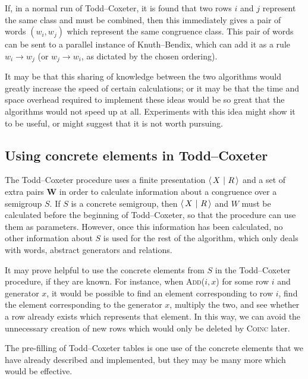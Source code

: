 If, in a normal run of Todd--Coxeter, it is found that two rows $i$ and $j$
represent the same class and must be combined, then this immediately gives a
pair of words $(w_i,w_j)$ which represent the same congruence class.  This pair
of words can be sent to a parallel instance of Knuth--Bendix, which can add it as
a rule $w_i \to w_j$ (or $w_j \to w_i$, as dictated by the chosen ordering).

It may be that this sharing of knowledge between the two algorithms would
greatly increase the speed of certain calculations; or it may be that the time
and space overhead required to implement these ideas would be so great that the
algorithms would not speed up at all.  Experiments with this idea might show it
to be useful, or might suggest that it is not worth pursuing.

\subsection{Using concrete elements in Todd--Coxeter}
\label{sec:tc-concrete-elms}
The Todd--Coxeter procedure uses a finite presentation $\left\langle\,X ~\middle|~ R\,\right\rangle$ and a set of
extra pairs $\mathbf{W}$ in order to calculate information about a congruence
over a semigroup $S$.  If $S$ is a concrete semigroup, then $\left\langle\,X ~\middle|~ R\,\right\rangle$ and $W$
must be calculated before the beginning of Todd--Coxeter, so that the procedure
can use them as parameters.  However, once this information has been calculated,
no other information about $S$ is used for the rest of the algorithm, which only
deals with words, abstract generators and relations.

It may prove helpful to use the concrete elements from $S$ in the Todd--Coxeter
procedure, if they are known.  For instance, when \textsc{Add($i, x$)} for some
row $i$ and generator $x$, it would be possible to find an element corresponding
to row $i$, find the element corresponding to the generator $x$, multiply the
two, and see whether a row already exists which represents that element.  In
this way, we can avoid the unnecessary creation of new rows which would only be
deleted by \textsc{Coinc} later.

The pre-filling of Todd--Coxeter tables is one use of the concrete elements that
we have already described and implemented, but they may be many more which would
be effective.

